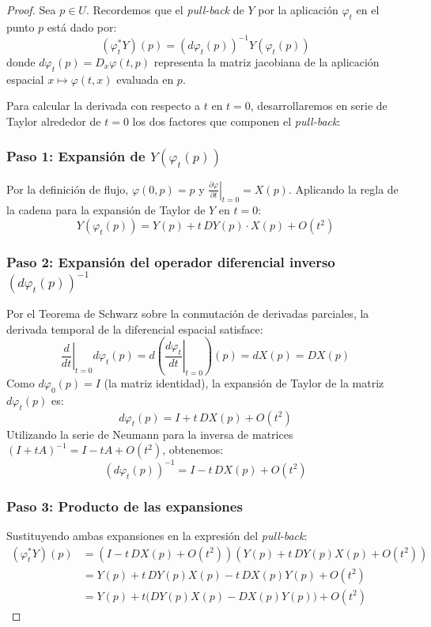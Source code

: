 \documentclass[11pt,a4paper]{article}
\theoremstyle{definition}
\theoremstyle{plain}
\theoremstyle{remark}
\begin{document}
	\begin{proof}
		Sea $p \in U$. Recordemos que el \textit{pull-back} de $Y$ por la aplicación $\varphi_t$ en el punto $p$ está dado por:
		\[
		(\varphi_t^* Y)(p) = \left( d\varphi_t(p) \right)^{-1} Y(\varphi_t(p))
		\]
		donde $d\varphi_t(p) = D_x \varphi(t, p)$ representa la matriz jacobiana de la aplicación espacial $x \mapsto \varphi(t, x)$ evaluada en $p$.
		
		Para calcular la derivada con respecto a $t$ en $t=0$, desarrollaremos en serie de Taylor alrededor de $t=0$ los dos factores que componen el \textit{pull-back}:
		
		\subsubsection*{Paso 1: Expansión de $Y(\varphi_t(p))$}
		Por la definición de flujo, $\varphi(0, p) = p$ y $\left.\frac{\partial \varphi}{\partial t}\right|_{t=0} = X(p)$. Aplicando la regla de la cadena para la expansión de Taylor de $Y$ en $t=0$:
		\[
		Y(\varphi_t(p)) = Y(p) + t \, DY(p) \cdot X(p) + O(t^2)
		\]
		
		\subsubsection*{Paso 2: Expansión del operador diferencial inverso $(d\varphi_t(p))^{-1}$}
		Por el Teorema de Schwarz sobre la conmutación de derivadas parciales, la derivada temporal de la diferencial espacial satisface:
		\[
		\left. \frac{d}{dt} \right|_{t=0} d\varphi_t(p) = d \left( \left. \frac{d\varphi_t}{dt} \right|_{t=0} \right)(p) = dX(p) = DX(p)
		\]
		Como $d\varphi_0(p) = I$ (la matriz identidad), la expansión de Taylor de la matriz $d\varphi_t(p)$ es:
		\[
		d\varphi_t(p) = I + t \, DX(p) + O(t^2)
		\]
		Utilizando la serie de Neumann para la inversa de matrices $(I + t A)^{-1} = I - t A + O(t^2)$, obtenemos:
		\[
		\left( d\varphi_t(p) \right)^{-1} = I - t \, DX(p) + O(t^2)
		\]
		
		\subsubsection*{Paso 3: Producto de las expansiones}
		Sustituyendo ambas expansiones en la expresión del \textit{pull-back}:
		\[
		\begin{aligned}
			(\varphi_t^* Y)(p) &= \left( I - t \, DX(p) + O(t^2) \right) \left( Y(p) + t \, DY(p) X(p) + O(t^2) \right) \\
			&= Y(p) + t \, DY(p) X(p) - t \, DX(p) Y(p) + O(t^2) \\
			&= Y(p) + t \Big( DY(p) X(p) - DX(p) Y(p) \Big) + O(t^2)
		\end{aligned}
		\]
		

\end{proof}
\end{document}

